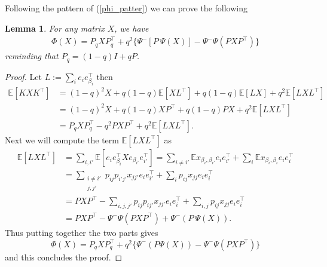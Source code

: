 \documentclass[a4paper,12pt]{article}
\newtheorem{lemma}{Lemma}
\begin{document}
Following the pattern of (\ref{phi_patter}) we can prove the following
\begin{lemma} For any matrix $X$, we have
	\begin{align*}
		\Phi(X) = P_qXP_q^\top +q^2\big\{\Psi^{-} [P\ \Psi(X)] - \Psi^- \Psi(PXP^\top) 	\big\}
	\end{align*}
	reminding that $P_q = (1-q)I + qP$.
\end{lemma}
\begin{proof}
	Let $L := \sum_i e_i e_{\beta_i}^\top$
	then 
	\begin{align*}
		\mathbb E[KXK^\top] &= (1-q)^2X + q(1-q)\mathbb E[XL^\top ] + q(1-q)\mathbb E[LX] + q^2 \mathbb E[LXL^\top] \\
		& = (1-q)^2 X + q(1-q)XP^\top + q(1-q)PX + q^2 \mathbb E[LXL^\top] \\
		&= P_q X P_q^\top - q^2PXP^\top + q^2 \mathbb E[LXL^\top].
	\end{align*}
	Next we will compute the term $\mathbb E[LXL^\top] $ as
	\begin{align*}
		\mathbb E[LXL^\top] &= \sum_{i,i'} \mathbb E[e_ie_{\beta_i}^\top Xe_{\beta_{i'}}e_{i'}^\top ] = \sum_{i\neq i'} \mathbb Ex_{\beta_i,\beta_{i'}}e_ie_{i'}^\top + \sum_i \mathbb Ex_{\beta_i,\beta_i} e_ie_i^\top \\
		&= \sum_{\substack{i\neq i'\\ j,j'}} p_{ij}p_{i'j'} x_{jj'} e_ie_{i'}^\top + \sum_i p_{ij} x_{jj} e_i e_i^\top \\
		&= PXP^\top - \sum_{i,j,j'} p_{ij}p_{ij'} x_{jj'} e_{i}e_{i}^\top + \sum_{i,j}p_{ij}x_{jj}e_{i}e_{i}^\top \\          
		& = PXP^\top - \Psi^{-}\Psi(PXP^\top) + \Psi^{-} (P\ \Psi(X)).
	\end{align*}
	Thus putting together the two parts gives
	$$ \Phi(X) = P_qXP_q^\top + q^2\{\Psi^-(P\Psi(X)) -\Psi^- \Psi (PXP^\top)\} $$
	and this concludes the proof.
\end{proof}
\end{document}
